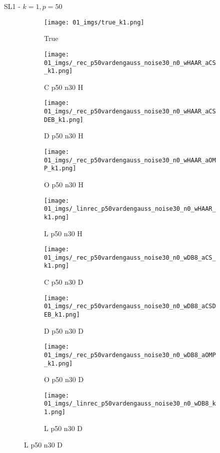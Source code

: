 \begin{frame}{SL1 - $k=1,p=50$}{}
\begin{figure}
\begin{subfigure}{0.1\textwidth}
\texttt{[image: 01\_imgs/true\_k1.png]}
\caption*{\Tiny True}
\end{subfigure}
\begin{subfigure}{0.1\textwidth}
\texttt{[image: 01\_imgs/\_rec\_p50vardengauss\_noise30\_n0\_wHAAR\_aCS\_k1.png]}
\caption*{\Tiny C p50 n30 H}
\end{subfigure}
\begin{subfigure}{0.1\textwidth}
\texttt{[image: 01\_imgs/\_rec\_p50vardengauss\_noise30\_n0\_wHAAR\_aCSDEB\_k1.png]}
\caption*{\Tiny D p50 n30 H}
\end{subfigure}
\begin{subfigure}{0.1\textwidth}
\texttt{[image: 01\_imgs/\_rec\_p50vardengauss\_noise30\_n0\_wHAAR\_aOMP\_k1.png]}
\caption*{\Tiny O p50 n30 H}
\end{subfigure}
\begin{subfigure}{0.1\textwidth}
\texttt{[image: 01\_imgs/\_linrec\_p50vardengauss\_noise30\_n0\_wHAAR\_k1.png]}
\caption*{\Tiny L p50 n30 H}
\end{subfigure}
\begin{subfigure}{0.1\textwidth}
\texttt{[image: 01\_imgs/\_rec\_p50vardengauss\_noise30\_n0\_wDB8\_aCS\_k1.png]}
\caption*{\Tiny C p50 n30 D}
\end{subfigure}
\begin{subfigure}{0.1\textwidth}
\texttt{[image: 01\_imgs/\_rec\_p50vardengauss\_noise30\_n0\_wDB8\_aCSDEB\_k1.png]}
\caption*{\Tiny D p50 n30 D}
\end{subfigure}
\begin{subfigure}{0.1\textwidth}
\texttt{[image: 01\_imgs/\_rec\_p50vardengauss\_noise30\_n0\_wDB8\_aOMP\_k1.png]}
\caption*{\Tiny O p50 n30 D}
\end{subfigure}
\begin{subfigure}{0.1\textwidth}
\texttt{[image: 01\_imgs/\_linrec\_p50vardengauss\_noise30\_n0\_wDB8\_k1.png]}
\caption*{\Tiny L p50 n30 D}
\end{subfigure}
\end{figure}
\end{frame}



